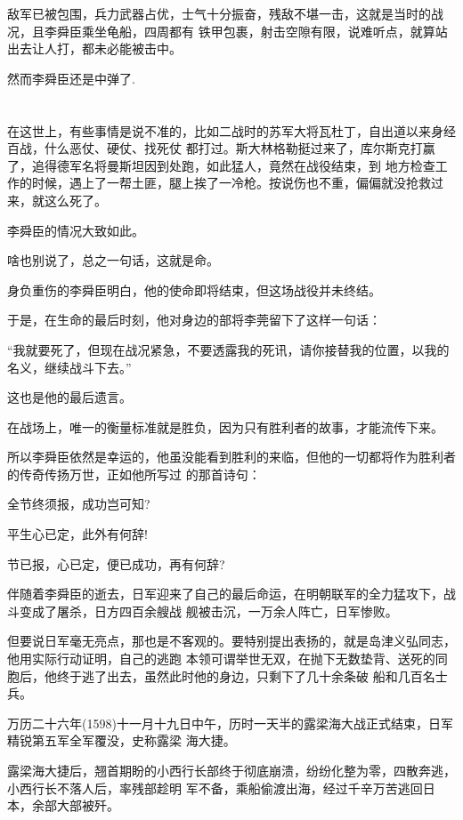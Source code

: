 \documentclass[11pt,a4paper,onecolumn]{article}
\begin{document}
敌军已被包围，兵力武器占优，士气十分振奋，残敌不堪一击，这就是当时的战况，且李舜臣乘坐龟船，四周都有
铁甲包裹，射击空隙有限，说难听点，就算站出去让人打，都未必能被击中。

然而李舜臣还是中弹了.

\section[\thesection]{}

在这世上，有些事情是说不准的，比如二战时的苏军大将瓦杜丁，自出道以来身经百战，什么恶仗、硬仗、找死仗
都打过。斯大林格勒挺过来了，库尔斯克打赢了，追得德军名将曼斯坦因到处跑，如此猛人，竟然在战役结束，到
地方检查工作的时候，遇上了一帮土匪，腿上挨了一冷枪。按说伤也不重，偏偏就没抢救过来，就这么死了。

李舜臣的情况大致如此。

啥也别说了，总之一句话，这就是命。

身负重伤的李舜臣明白，他的使命即将结束，但这场战役并未终结。

于是，在生命的最后时刻，他对身边的部将李莞留下了这样一句话：

``我就要死了，但现在战况紧急，不要透露我的死讯，请你接替我的位置，以我的名义，继续战斗下去。''

这也是他的最后遗言。

在战场上，唯一的衡量标准就是胜负，因为只有胜利者的故事，才能流传下来。

所以李舜臣依然是幸运的，他虽没能看到胜利的来临，但他的一切都将作为胜利者的传奇传扬万世，正如他所写过
的那首诗句：

全节终须报，成功岂可知?

平生心已定，此外有何辞!

节已报，心已定，便已成功，再有何辞?

伴随着李舜臣的逝去，日军迎来了自己的最后命运，在明朝联军的全力猛攻下，战斗变成了屠杀，日方四百余艘战
舰被击沉，一万余人阵亡，日军惨败。

但要说日军毫无亮点，那也是不客观的。要特别提出表扬的，就是岛津义弘同志，他用实际行动证明，自己的逃跑
本领可谓举世无双，在抛下无数垫背、送死的同胞后，他终于逃了出去，虽然此时他的身边，只剩下了几十余条破
船和几百名士兵。

万历二十六年(1598)十一月十九日中午，历时一天半的露梁海大战正式结束，日军精锐第五军全军覆没，史称露梁
海大捷。

露梁海大捷后，翘首期盼的小西行长部终于彻底崩溃，纷纷化整为零，四散奔逃，小西行长不落人后，率残部趁明
军不备，乘船偷渡出海，经过千辛万苦逃回日本，余部大部被歼。
\end{document}
